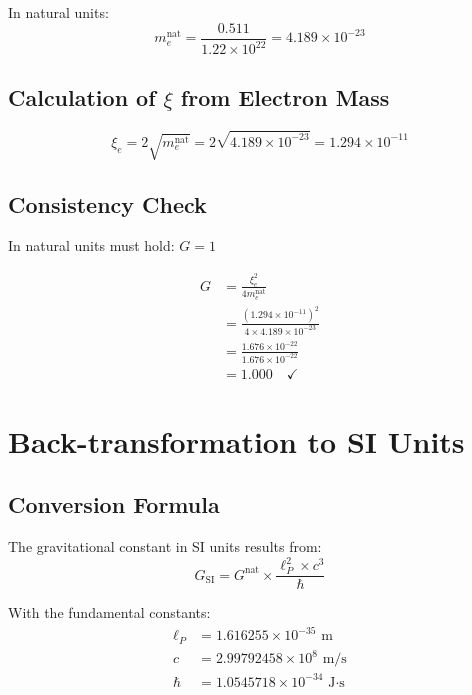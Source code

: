 \documentclass[12pt,a4paper]{article}
\begin{document}
	In natural units:
	\begin{equation}
		m_e^{\text{nat}} = \frac{0.511}{1.22 \times 10^{22}} = 4.189 \times 10^{-23}
	\end{equation}
	
	\subsection{Calculation of $\xi$ from Electron Mass}
	
	\begin{equation}
		\xi_e = 2\sqrt{m_e^{\text{nat}}} = 2\sqrt{4.189 \times 10^{-23}} = 1.294 \times 10^{-11}
	\end{equation}
	
	\subsection{Consistency Check}
	
	In natural units must hold: $G = 1$
	
	\begin{align}
		G &= \frac{\xi_e^2}{4m_e^{\text{nat}}}\\
		&= \frac{(1.294 \times 10^{-11})^2}{4 \times 4.189 \times 10^{-23}}\\
		&= \frac{1.676 \times 10^{-22}}{1.676 \times 10^{-22}}\\
		&= 1.000 \quad \checkmark
	\end{align}
	
	\section{Back-transformation to SI Units}
	
	\subsection{Conversion Formula}
	
	The gravitational constant in SI units results from:
	\begin{equation}
		G_{\text{SI}} = G^{\text{nat}} \times \frac{\ell_P^2 \times c^3}{\hbar}
	\end{equation}
	
	With the fundamental constants:
	\begin{align}
		\ell_P &= 1.616255 \times 10^{-35} \text{ m}\\
		c &= 2.99792458 \times 10^8 \text{ m/s}\\
		\hbar &= 1.0545718 \times 10^{-34} \text{ J·s}
	\end{align}
	
\end{document}
